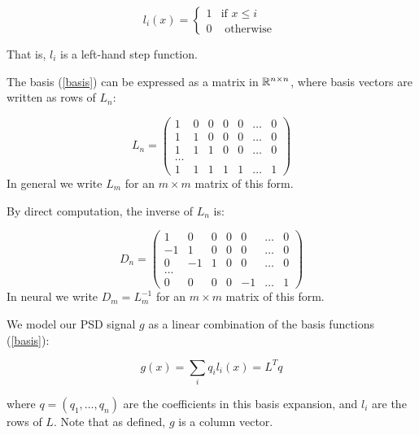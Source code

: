\begin{definition}
\begin{equation}
l_i\left(x\right) =
\begin{cases}
1 & \text{if } x \leq i \\
0 & \text{ otherwise } 
\end{cases}
\label{basis}
\end{equation}

That is, \(l_i\) is a left-hand step function. 

The basis (\ref{basis}) can be expressed as a matrix in \({\mathbb{R}}^{n \times n}\), where basis vectors are written as rows of \(L_n\):

\begin{equation}
L_n = \begin{pmatrix}
 1 & 0 & 0 & 0  & 0 & \ldots & 0 \\
  1 & 1 & 0 & 0  & 0 & \ldots & 0\\
     1 & 1 & 1 & 0  & 0 & \ldots & 0  \\
    \ldots  \\
     1 & 1 & 1 & 1  & 1 & \ldots & 1 
\end{pmatrix}
\end{equation}
In general we write \(L_m\) for an \(m \times m\) matrix of this form.
\label{lower-L}
\end{definition}

\begin{lemma}
By direct computation, the inverse of \(L_n\) is:

\begin{equation}
D_n = \begin{pmatrix}
 1 & 0 & 0 & 0  & 0 & \ldots & 0 \\
  -1 & 1 & 0 & 0  & 0 & \ldots & 0\\
     0 & -1 & 1 & 0  & 0 & \ldots & 0  \\
    \ldots  \\
     0 & 0 & 0 & 0  & -1 & \ldots & 1
\end{pmatrix}
\end{equation}
In neural we write \(D_m = L_m^{-1}\) for an \(m \times m\) matrix of this form.
\label{inv-L}
\end{lemma}

\begin{definition}
We model our PSD signal \(g\) as a linear combination of the basis functions (\ref{basis}):

\begin{equation}
g\left(x\right) = \sum_i q_i l_i\left(x\right) = L^Tq
\label{basis-expansion}
\end{equation}

where \(q = (q_1, \ldots, q_n) \) are the coefficients in this basis expansion, and \(l_i\) are the rows of \(L\). Note that as defined, \(g\) is a column vector.
\end{definition}

